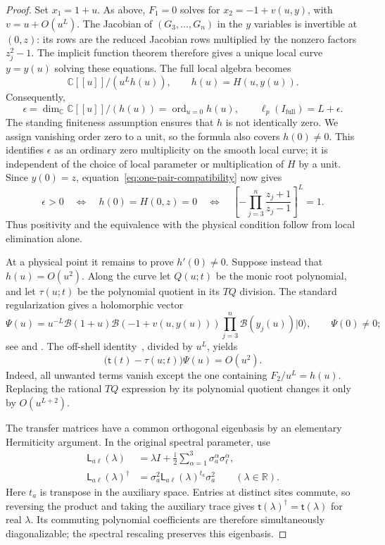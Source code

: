 \documentclass[11pt]{article}
\theoremstyle{definition}
\newcommand{\ii}{\mathrm i}
\newcommand{\C}{\mathbb C}
\newcommand{\ord}{\operatorname{ord}}
\begin{document}
\begin{proof}
Set $x_1=1+u$. As above, $F_1=0$ solves for
$x_2=-1+v(u,y)$, with $v=u+O(u^L)$. The Jacobian of
$(G_3,\ldots,G_n)$ in the $y$ variables is invertible at $(0,z)$:
its rows are the reduced Jacobian rows multiplied by the nonzero
factors $z_j^2-1$. The implicit function theorem therefore gives a
unique local curve $y=y(u)$ solving these equations. The full local
algebra becomes
\[
 \C[[u]]/(u^Lh(u)),\qquad h(u)=H(u,y(u)).
\]
Consequently,
\begin{equation}\label{eq:simple-pair-residual-multiplicity}
 \epsilon=\dim_\C\C[[u]]/(h(u))
          =\ord_{u=0}h(u),\qquad
 \ell_p(I_{\mathrm{full}})=L+\epsilon.
\end{equation}
The standing finiteness assumption ensures that $h$ is not identically
zero. We assign vanishing order zero to a unit, so the formula also
covers $h(0)\ne0$. This identifies $\epsilon$ as an ordinary zero
multiplicity on the smooth local curve; it is independent of the
choice of local parameter or multiplication of $H$ by a unit.
Since $y(0)=z$, equation~\eqref{eq:one-pair-compatibility} now gives
\[
 \boxed{\epsilon>0
 \quad\Longleftrightarrow\quad h(0)=H(0,z)=0
 \quad\Longleftrightarrow\quad
 \left[-\prod_{j=3}^n\frac{z_j+1}{z_j-1}\right]^L=1.}
\]
Thus positivity and the equivalence with the physical condition follow
from local elimination alone.

At a physical point it remains to prove $h'(0)\ne0$. Suppose instead
that $h(u)=O(u^2)$. Along the curve let $Q(u;t)$ be the monic root
polynomial, and let $\tau(u;t)$ be the polynomial quotient in its
$TQ$ division. The standard regularization gives a holomorphic vector
\[
 \Psi(u)=u^{-L}\mathcal B(1+u)\mathcal B(-1+v(u,y(u)))
                  \prod_{j=3}^n\mathcal B(y_j(u))|0\rangle,
 \qquad \Psi(0)\ne0;
\]
see \cite[Section~3]{NW2013} and \cite[Lemma~3]{GJ2020}.
The off-shell identity~\cite[eqs.~(7)--(8)]{GJ2020}, divided by
$u^L$, yields
\[
 \bigl(\mathsf t(t)-\tau(u;t)\bigr)\Psi(u)=O(u^2).
\]
Indeed, all unwanted terms vanish except the one containing
$F_2/u^L=h(u)$. Replacing the rational $TQ$ expression by its
polynomial quotient changes it only by $O(u^{L+2})$.

The transfer matrices have a common orthogonal eigenbasis by an
elementary Hermiticity argument. In the original spectral parameter,
use
\[
 \begin{aligned}
 \mathsf L_{a\ell}(\lambda)
 &=\lambda I+\frac{\ii}{2}\sum_{\alpha=1}^3
                         \sigma_a^\alpha\sigma_\ell^\alpha,\\
 \mathsf L_{a\ell}(\lambda)^\dagger
 &=\sigma_a^2\mathsf L_{a\ell}(\lambda)^{t_a}\sigma_a^2
                  \qquad(\lambda\in\mathbb R).
 \end{aligned}
\]
Here $t_a$ is transpose in the auxiliary space. Entries at distinct
sites commute, so reversing the product and taking the auxiliary
trace gives $\mathsf t(\lambda)^\dagger=\mathsf t(\lambda)$ for
real $\lambda$. Its commuting polynomial coefficients are therefore
simultaneously diagonalizable; the spectral rescaling preserves this
eigenbasis.


\end{proof}
\end{document}
